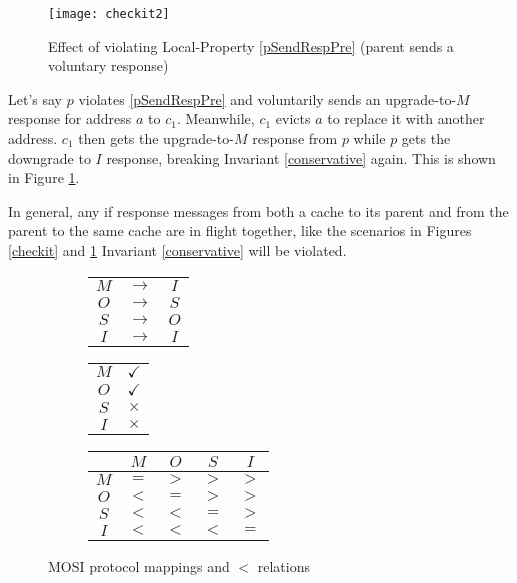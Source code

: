 \begin{figure}
\centering
\texttt{[image: checkit2]}
\caption{Effect of violating Local-Property \ref{pSendRespPre} (parent sends a voluntary response)}
\label{checkit2}
\end{figure}

Let's say $p$ violates \ref{pSendRespPre} and voluntarily sends an
upgrade-to-$M$ response for address $a$ to $c_1$.  Meanwhile, $c_1$ evicts $a$
to replace it with another address. $c_1$ then gets the upgrade-to-$M$ response
from $p$ while $p$ gets the downgrade to $I$ response, breaking Invariant
\ref{conservative} again. This is shown in Figure \ref{checkit2}.

In general, any if response messages from both a cache to its parent and from
the parent to the same cache are in flight together, like the scenarios in
Figures \ref{checkit} and \ref{checkit2} Invariant \ref{conservative} will be
violated.

\begin{figure}
\begin{subfigure}{.25\linewidth}
\centering
\begin{tabular}{|ccc|}
\hline
$M$ & $\rightarrow$ & $I$\\
$O$ & $\rightarrow$ & $S$\\
$S$ & $\rightarrow$ & $O$\\
$I$ & $\rightarrow$ & $I$\\
\hline
\end{tabular}
\end{subfigure}
\begin{subfigure}{.25\linewidth}
\centering
\begin{tabular}{|c|c|}
\hline
$M$ & $\checkmark$\\
$O$ & $\checkmark$\\
$S$ & $\times$\\
$I$ & $\times$\\
\hline
\end{tabular}
\end{subfigure}
\begin{subfigure}{.48\linewidth}
\centering
\begin{tabular}{|c|cccc|}
\hline
& $M$ & $O$ & $S$ & $I$\\
\hline
$M$ & $=$ & $>$ & $>$ & $>$\\
$O$ & $<$ & $=$ & $>$ & $>$\\
$S$ & $<$ & $<$ & $=$ & $>$\\
$I$ & $<$ & $<$ & $<$ & $=$\\
\hline
\end{tabular}
\end{subfigure}
\caption{MOSI protocol mappings and $<$ relations}
\label{mosi}
\end{figure}

